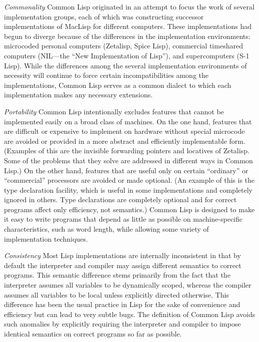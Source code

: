 \begin{flushdesc}
\item[\emph{Commonality}]
Common Lisp originated in an attempt to focus the
work of several implementation groups, each of which was constructing successor
implementations of MacLisp for different computers.  These
implementations had begun to diverge because of the differences in the
implementation environments: microcoded personal computers (Zetalisp,
Spice Lisp), commercial timeshared computers (NIL---the ``New Implementation of
Lisp''), and supercomputers (S-1 Lisp).  While the differences among the several
implementation environments of necessity will continue to force
certain incompatibilities among the
implementations, Common Lisp serves as a common dialect to
which each implementation makes any necessary extensions.

\item[\emph{Portability}]
\begingroup{}
Common Lisp intentionally excludes features
that cannot be implemented easily on a broad class of machines.
On the one hand, features that are difficult or expensive
to implement on hardware without special microcode are avoided
or provided in a more abstract and efficiently implementable form.
(Examples of this are the invisible forwarding pointers
and locatives of Zetalisp.  Some of the problems that they solve
are addressed in different ways in Common Lisp.)
On the other hand, features that are useful only on certain ``ordinary''
or ``commercial'' processors are avoided or made optional.  (An example of
this is the type declaration facility, which is useful in some
implementations and completely ignored in others.  Type declarations are
completely optional and for correct programs
affect only efficiency, not semantics.)
Common Lisp is designed to make it easy to write programs
that depend as little as possible on machine-specific
characteristics, such as word length, while allowing some variety of
implementation \hbox{techniques}.
\par\endgroup

\item[\emph{Consistency}]
Most Lisp implementations are internally inconsistent
in that by default the interpreter and compiler may assign different
semantics to correct programs.
This semantic difference stems primarily from the fact
that the interpreter assumes all variables to be dynamically scoped,
whereas the compiler assumes all variables to be local unless explicitly
directed otherwise.  This difference has been the usual practice in Lisp
for the sake of convenience
and efficiency but can lead to very subtle bugs.  The definition of
Common Lisp avoids such anomalies by explicitly requiring the interpreter
and compiler to impose identical semantics on correct programs
so far as possible.


\end{flushdesc}
